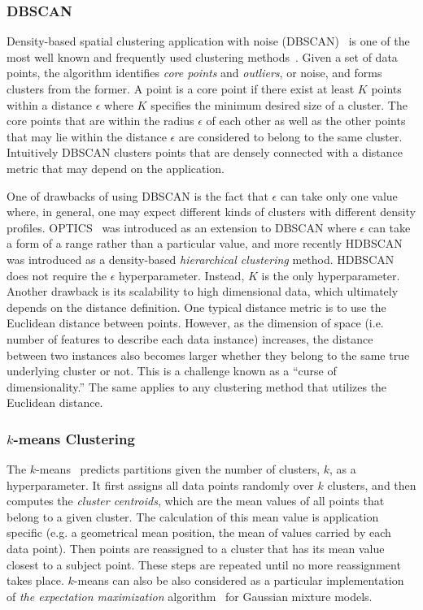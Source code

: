 \documentclass{ws-rv9x6}
\begin{document}
\subsubsection{DBSCAN}
Density-based spatial clustering application with noise (DBSCAN)~\cite{dbscan} is one of the most well known and frequently used clustering methods~\cite{church2013larsoft,Amrouche_2019}. Given a set of data points, the algorithm identifies {\it core points} and {\it outliers}, or noise, and forms clusters from the former. A point is a core point if there exist at least $K$ points within a distance $\epsilon$ where $K$ specifies the minimum desired size of a cluster. The core points that are within the radius $\epsilon$ of each other as well as the other points that may lie within the distance $\epsilon$ are considered to belong to the same cluster. Intuitively DBSCAN clusters points that are densely connected with a distance metric that may depend on the application. 

One of drawbacks of using DBSCAN is the fact that $\epsilon$ can take only one value where, in general, one may expect different kinds of clusters with different density profiles. OPTICS~\cite{OPTICS} was introduced as an extension to DBSCAN where $\epsilon$ can take a form of a range rather than a particular value, and more recently HDBSCAN~\cite{HDBSCAN} was introduced as a density-based {\it hierarchical clustering} method. HDBSCAN does not require the $\epsilon$ hyperparameter. Instead, $K$ is the only hyperparameter.  
Another drawback is its scalability to high dimensional data, which ultimately depends on the distance definition. One typical distance metric is to use the Euclidean distance between points. However, as the dimension of space (i.e. number of features to describe each data instance) increases, the distance between two instances also becomes larger whether they belong to the same true underlying cluster or not. This is a challenge known as a ``curse of dimensionality.'' The same applies to any clustering method that utilizes the Euclidean distance.

\subsubsection{$k$-means Clustering}
The $k$-means~\cite{macqueen1967} predicts partitions given the number of clusters, $k$, as a hyperparameter. It first assigns all data points randomly over $k$ clusters, and then computes the {\it cluster centroids}, which are the mean values of all points that belong to a given cluster. The calculation of this mean value is application specific (e.g. a geometrical mean position, the mean of values carried by each data point). Then points are reassigned to a cluster that has its mean value closest to a subject point. These steps are repeated until no more reassignment takes place. $k$-means can also be also considered as a particular implementation of {\it the expectation maximization}
algorithm~\cite{10.2307/2984875} for Gaussian mixture models. 
\end{document}
